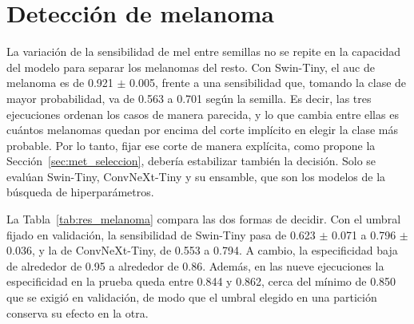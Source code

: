 \section{Detección de melanoma}
\label{sec:res_melanoma}

La variación de la sensibilidad de \gls{mel} entre semillas no se repite en la capacidad del modelo para separar los
melanomas del resto. Con Swin-Tiny, el \gls{auc} de melanoma es de 0.921 $\pm$ 0.005, frente a una sensibilidad que,
tomando la clase de mayor probabilidad, va de 0.563 a 0.701 según la semilla. Es decir, las tres ejecuciones ordenan
los casos de manera parecida, y lo que cambia entre ellas es cuántos melanomas quedan por encima del corte implícito
en elegir la clase más probable. Por lo tanto, fijar ese corte de manera explícita, como propone la
Sección~\ref{sec:met_seleccion}, debería estabilizar también la decisión. Solo se evalúan Swin-Tiny, ConvNeXt-Tiny y
su ensamble, que son los modelos de la búsqueda de hiperparámetros.

La Tabla~\ref{tab:res_melanoma} compara las dos formas de decidir. Con el umbral fijado en validación, la
sensibilidad de Swin-Tiny pasa de 0.623 $\pm$ 0.071 a 0.796 $\pm$ 0.036, y la de ConvNeXt-Tiny, de 0.553 a 0.794. A
cambio, la especificidad baja de alrededor de 0.95 a alrededor de 0.86. Además, en las nueve ejecuciones la
especificidad en la prueba queda entre 0.844 y 0.862, cerca del mínimo de 0.850 que se exigió en validación, de modo
que el umbral elegido en una partición conserva su efecto en la otra.

